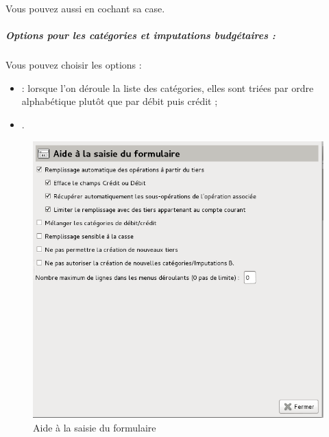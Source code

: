 

Vous pouvez aussi  en cochant sa case.


\subparagraph{Options pour les catégories et imputations budgétaires :\label{setup-form-categories}}

Vous pouvez choisir les options :

\begin{itemize}

	\item {} : lorsque l'on déroule la liste des catégories, elles sont triées par ordre alphabétique plutôt que par débit puis crédit ;
	\item {}.
\end{itemize}

\ifIllustration
\begin{figure}[ht]
\begin{center}
\includegraphics[scale=0.5]{image/screenshot/setup_enterHelp}
\end{center}
\caption{Aide à la saisie du formulaire}
\label{setup-enterHelp-img}
\end{figure}
\fi





